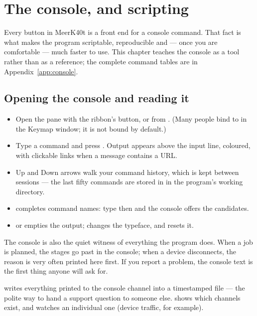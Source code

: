 \chapter{The console, and scripting}
\label{ch:console}

Every button in MeerK40t is a front end for a console command. That fact is what
makes the program scriptable, reproducible and --- once you are comfortable ---
much faster to use. This chapter teaches the console as a tool rather than as a
reference; the complete command tables are in Appendix~\ref{app:console}.

\section{Opening the console and reading it}

\begin{itemize}
  \item Open the  pane with the ribbon's  button, or
        from . (Many people bind  to
         in the Keymap window; it is not bound by
default.)
  \item Type a command and press . Output appears above the input line,
        coloured, with clickable links when a message contains a URL.
  \item Up and Down arrows walk your command history, which is kept between
        sessions --- the last fifty commands are stored in 
        in the program's working directory.
  \item {} completes command names: type  then  and the
        console offers the candidates.
  \item {} or  empties the output;  changes
        the typeface, and  resets it.
\end{itemize}

\noindent The console is also the quiet witness of everything the program does.
When a job is planned, the stages go past in the console; when a device
disconnects, the reason is very often printed here first. If you report a problem,
the console text is the first thing anyone will ask for.

\begin{tipbox}
 writes everything printed to the console channel into a
timestamped file --- the polite way to hand a support question to someone else.
 shows which channels exist, and 
watches an individual one (device traffic, for example).
\end{tipbox}

